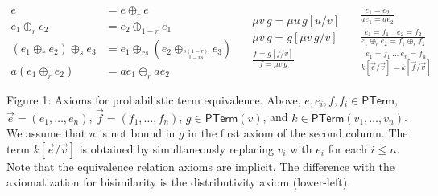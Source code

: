 \begin{center}
\hypertarget{html:S8.EGx3}{} %
\hypertarget{html:S3.Ex10}{}  %
\hypertarget{html:S3.Ex10.m1}{}\[\displaystyle
\begin{aligned}
e&=e\oplus_r e\\
e_1\oplus_r e_2&=e_2\oplus_{1-r}e_1\\
(e_1\oplus_r e_2)\oplus_s e_3&=e_1\oplus_{rs}(e_2\oplus_{\frac{s(1-r)}{1-rs}}e_3)\\
a(e_1\oplus_r e_2)&=ae_1\oplus_r ae_2
\end{aligned}
\quad
\begin{gathered}
\mu v\,g=\mu u\,g[u/v]\\
\mu v\,g=g[\mu v\,g/v]\\
\frac{f=g[f/v]}{f=\mu v\,g}
\end{gathered}
\quad
\begin{gathered}
\frac{e_1=e_2}{ae_1=ae_2}\\[3pt]
\frac{e_1=f_1\quad e_2=f_2}{e_1\oplus_r e_2=f_1\oplus_r f_2}\\[3pt]
\frac{e_1=f_1\ \dots\ e_n=f_n}{k[\vec e/\vec v]=k[\vec f/\vec v]}
\end{gathered}
\]    
\par\smallskip Figure 1: Axioms for probabilistic term equivalence. Above, %
\hypertarget{html:S3.F1.m12}{}\({e,e_{i},f,f_{i}\in\mathsf{PTerm}}\), %
\hypertarget{html:S3.F1.m13}{}\({\vec{e}=(e_{1},\dots,e_{n})}\), %
\hypertarget{html:S3.F1.m14}{}\({\vec{f}=(f_{1},\dots,f_{n})}\), %
\hypertarget{html:S3.F1.m15}{}\({g\in\mathsf{PTerm}(v)}\), and %
\hypertarget{html:S3.F1.m16}{}\({k\in\mathsf{PTerm}(v_{1},\dots,v_{n})}\). We assume that %
\hypertarget{html:S3.F1.m17}{}\({u}\) is not bound in %
\hypertarget{html:S3.F1.m18}{}\({g}\) in the first axiom of the second column. The term %
\hypertarget{html:S3.F1.m19}{}\({k[\vec{e}/\vec{v}]}\) is obtained by simultaneously replacing %
\hypertarget{html:S3.F1.m20}{}\({v_{i}}\) with %
\hypertarget{html:S3.F1.m21}{}\({e_{i}}\) for each %
\hypertarget{html:S3.F1.m22}{}\({i\leq n}\). Note that the equivalence relation axioms are implicit. The difference with the axiomatization for bisimilarity is the distributivity axiom (lower-left).
\par\medskip
 
\end{center}
